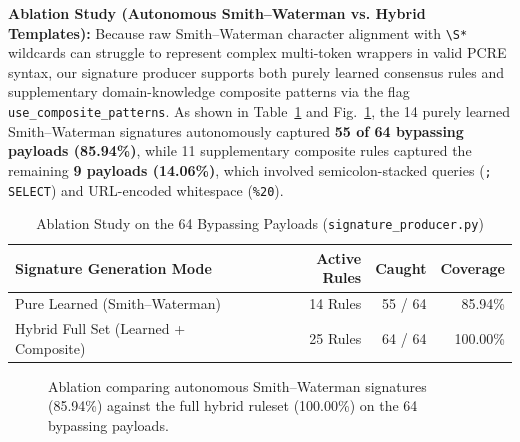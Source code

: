 \documentclass[conference]{IEEEtran}
\begin{document}
\textbf{Ablation Study (Autonomous Smith--Waterman vs. Hybrid Templates):} Because raw Smith--Waterman character alignment with \texttt{\textbackslash S*} wildcards can struggle to represent complex multi-token wrappers in valid PCRE syntax, our signature producer supports both purely learned consensus rules and supplementary domain-knowledge composite patterns via the flag \texttt{use\_composite\_patterns}. As shown in Table~\ref{tab:ablation} and Fig.~\ref{fig:ablation}, the 14 purely learned Smith--Waterman signatures autonomously captured \textbf{55 of 64 bypassing payloads (85.94\%)}, while 11 supplementary composite rules captured the remaining \textbf{9 payloads (14.06\%)}, which involved semicolon-stacked queries (\texttt{; SELECT}) and URL-encoded whitespace (\texttt{\%20}).

\begin{table}[t]
\centering
\caption{Ablation Study on the 64 Bypassing Payloads (\texttt{signature\_producer.py})}
\label{tab:ablation}
\scriptsize
\setlength{\tabcolsep}{4pt}
\begin{tabular}{lrrr}
\toprule
Signature Generation Mode & Active Rules & Caught & Coverage\\
\midrule
Pure Learned (Smith--Waterman) & 14 Rules & 55 / 64 & 85.94\%\\
Hybrid Full Set (Learned + Composite) & 25 Rules & 64 / 64 & 100.00\%\\
\bottomrule
\end{tabular}
\end{table}

\begin{figure}[t]
\centering
{}
\caption{Ablation comparing autonomous Smith--Waterman signatures (85.94\%) against the full hybrid ruleset (100.00\%) on the 64 bypassing payloads.}
\label{fig:ablation}
\end{figure}
\end{document}
